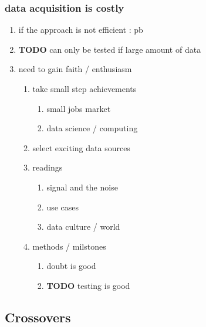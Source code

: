 \documentclass[11pt]{article}
\begin{document}
\subsubsection{data acquisition is costly}
\label{sec:orgefc294a}
\begin{enumerate}
\item if the approach is not efficient : pb
\label{sec:orgf839fb9}
\item {\bfseries\sffamily TODO} can only be tested if large amount of data
\label{sec:orgbcf450d}
\item need to gain faith / enthusiasm
\label{sec:org16cc9f2}
\begin{enumerate}
\item take small step achievements
\label{sec:org3f958b6}
\begin{enumerate}
\item small jobs market
\label{sec:org71640e5}
\item data science / computing
\label{sec:org8d2578f}
\end{enumerate}
\item select exciting data sources
\label{sec:org76991f5}
\item readings
\label{sec:org5f4eb94}
\begin{enumerate}
\item signal and the noise
\label{sec:orgdf1a87e}
\item use cases
\label{sec:orge2f92f9}
\item data culture / world
\label{sec:org8fe9af3}
\end{enumerate}
\item methods / milstones
\label{sec:org987ab53}
\begin{enumerate}
\item doubt is good
\label{sec:org87aac99}
\item {\bfseries\sffamily TODO} testing is good
\label{sec:org636735c}
\end{enumerate}
\end{enumerate}
\end{enumerate}
\subsection{Crossovers}
\label{sec:org6ae0673}
\end{document}
